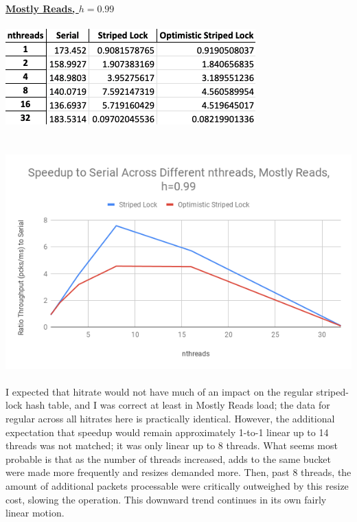 \documentclass{article}
\begin{document}
\begin{adjustwidth}{-2cm}{-2cm}
\underline{\textbf{Mostly Reads, $h=0.99$}}\\
\null\\
\includegraphics[width=\linewidth]{e3_09_99_data.png}\\ \null\\
\null\\
\includegraphics[width=\linewidth]{e3_09_99_graph.png}\\ \null\\
I expected that hitrate would not have much of an impact on the regular striped-lock hash table, and I was correct at least in Mostly Reads load; the data for regular across all hitrates here is practically identical. However, the additional expectation that speedup would remain approximately 1-to-1 linear up to 14 threads was not matched; it was only linear up to 8 threads. What seems most probable is that as the number of threads increased, adds to the same bucket were made more frequently and resizes demanded more. Then, past 8 threads, the amount of additional packets processable were critically outweighed by this resize cost, slowing the operation. This downward trend continues in its own fairly linear motion.\\

\end{adjustwidth}
\end{document}
